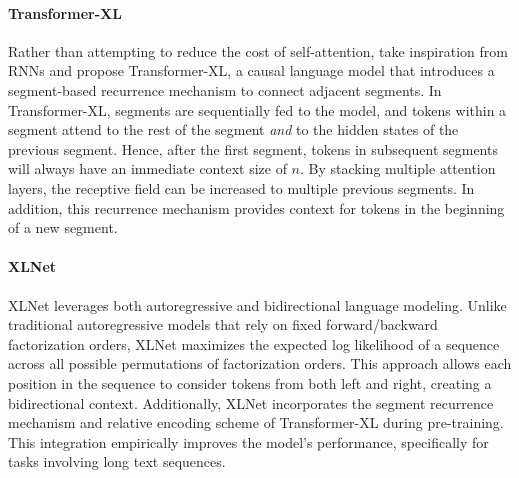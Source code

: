 \paragraph{Transformer-XL} Rather than attempting to reduce the cost of self-attention, \citet{dai2019transformer} take inspiration from \acp{RNN} and propose Transformer-XL, a causal language model that introduces a segment-based recurrence mechanism to connect adjacent segments. In Transformer-XL, segments are sequentially fed to the model, and tokens within a segment attend to the rest of the segment \textit{and} to the hidden states of the previous segment. Hence, after the first segment, tokens in subsequent segments will always have an immediate context size of $n$. By stacking multiple attention layers, the receptive field can be increased to multiple previous segments. In addition, this recurrence mechanism provides context for tokens in the beginning of a new segment. 
 


\paragraph{XLNet}

XLNet \citep{yang2019xlnet} leverages both autoregressive and bidirectional language modeling. Unlike traditional autoregressive models that rely on fixed forward/backward factorization orders, XLNet maximizes the expected log likelihood of a sequence across all possible permutations of factorization orders. This approach allows each position in the sequence to consider tokens from both left and right, creating a bidirectional context. Additionally, XLNet incorporates the segment recurrence mechanism and relative encoding scheme of Transformer-XL during pre-training. This integration empirically improves the model's performance, specifically for tasks involving long text sequences. 

